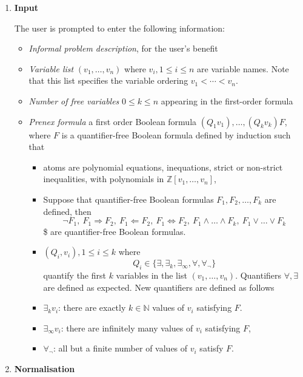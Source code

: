 \documentclass[
]{book}
\providecommand{\tightlist}{%
  \setlength{\itemsep}{0pt}\setlength{\parskip}{0pt}}
\theoremstyle{definition}
\theoremstyle{definition}
\theoremstyle{definition}
\theoremstyle{definition}
\theoremstyle{remark}
\begin{document}
\begin{enumerate}
\def\labelenumi{\arabic{enumi}.}
\item
  \textbf{Input}

  The user is prompted to enter the following information:

  \begin{itemize}
  \tightlist
  \item
    \emph{Informal problem description}, for the user's benefit
  \item
    \emph{Variable list} \((v_1,\ldots,v_n)\) where \(v_i, 1 \le i \le n\) are variable names. Note that this list specifies the variable ordering \(v_1 < \cdots < v_n\).
  \item
    \emph{Number of free variables} \(0 \le k \le n\) appearing in the first-order formula
  \item
    \emph{Prenex formula} a first order Boolean formula \((Q_1 v_1), \ldots, (Q_k v_k) F\), where \(F\) is a quantifier-free Boolean formula defined by induction such that

    \begin{itemize}
    \tightlist
    \item
      atoms are polynomial equations, inequations, strict or non-strict inequalities, with polynomials in \(\mathbb{Z}[v_1,\ldots,v_n]\),
    \item
      Suppose that quantifier-free Boolean formulas \(F_1, F_2,\ldots,F_k\) are defined, then
      \[
      \neg F_1,\> F_1 \Rightarrow F_2,\> F_1 \Leftarrow F_2,\> F_1 \Leftrightarrow F_2,\> F_1 \land \ldots \land F_k,\> F_1 \lor \ldots \lor F_k
      \]\$
      are quantifier-free Boolean formulas.
    \item
      \((Q_i,v_i), 1 \le i \le k\) where
      \[
      Q_i \in \{ \exists, \exists_k, \exists_\infty, \forall, \forall_\neg \}
      \]
      quantify the first \(k\) variables in the list \((v_1,\ldots,v_n)\). Quantifiers \(\forall, \exists\) are defined as expected. New quantifiers are defined as follows
    \item
      \(\exists_k v_i\): there are exactly \(k \in \mathbb{N}\) values of \(v_i\) satisfying \(F\).
    \item
      \(\exists_\infty v_i\): there are infinitely many values of \(v_i\) satisfying \(F\),
    \item
      \(\forall_\neg\): all but a finite number of values of \(v_i\) satisfy \(F\).
    \end{itemize}
  \end{itemize}
\item
  \textbf{Normalisation}


\end{enumerate}
\end{document}
